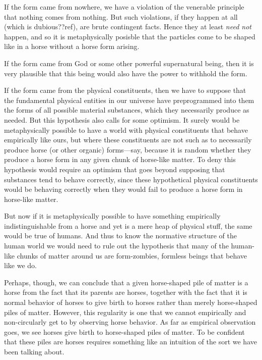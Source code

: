 If the form came from nowhere, we have a violation of the venerable principle that nothing comes from nothing.
But such violations, if they happen at all (which is dubious??ref), are brute contingent facts. Hence they at least
\textit{need
not} happen, and so it is metaphysically posisble that the particles come to be shaped like in a horse without a horse
form arising.

If the form came from God or some other powerful supernatural being, then it is very plausible that this being would also 
have the power to withhold the form.

If the form came from the physical constituents, then we have to suppose that the 
fundamental physical entities in our universe have preprogrammed into them the forms of all possible material substances,
which they necessarily produce as needed. But this hypothesis also calls for some optimism. It surely would be metaphysically
possible to have a world with physical constituents that behave empirically like ours, but where these constituents are not 
such as to necessarily produce horse (or other organic) forms---say, because it is random whether they produce a horse form 
in any given chunk of horse-like matter. To deny this hypothesis would require an optimism that goes beyond supposing that 
substances tend to behave correctly, since these hypothetical physical constituents would be behaving correctly when they 
would fail to produce a horse form in horse-like matter.

But now if it is metaphysically possible to have something empirically indistinguishable from a horse and yet is a mere
heap of physical stuff, the same would be true of humans. And thus to know the normative structure of the human world 
we would need to rule out the hypothesis that many of the human-like chunks of matter around us are form-zombies, formless
beings that behave like we do. 

Perhaps, though, we can conclude that a given horse-shaped pile of matter is a horse from the fact that its 
parents are horses, together with the fact that it is normal behavior of horses to give birth to horses rather
than merely horse-shaped piles of matter. However, this regularity is one that we cannot empirically and non-circularly get to by observing horse behavior. As far as empirical observation goes, we see horses give birth to horse-shaped 
piles of matter. To be confident that these piles are horses requires something like an intuition of the sort we have
been talking about.


